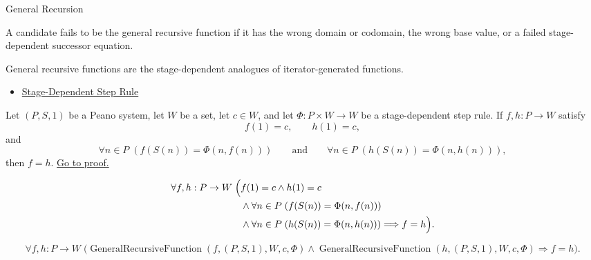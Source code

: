 \begin{topicbox}{General Recursion}
\begin{remark*}
A candidate fails to be the general recursive function if it has the wrong
domain or codomain, the wrong base value, or a failed stage-dependent
successor equation.
\end{remark*}

\begin{remark*}[Interpretation]
General recursive functions are the stage-dependent analogues of
iterator-generated functions.
\end{remark*}

\begin{remark*}[Dependencies]
\begin{itemize}
  \item \hyperref[def:stage-dependent-step-rule]{Stage-Dependent Step Rule}
\end{itemize}
\end{remark*}

\begin{tcolorbox}[colback=lembox, colframe=lemborder, arc=2pt,
  left=6pt, right=6pt, top=4pt, bottom=4pt,
  title={\small\textbf{Lemma (Uniqueness of General Recursive Functions)}},
  fonttitle=\small\bfseries]
\begin{lemma}
\label{lem:uniqueness-of-general-recursive-functions}
Let $(P,S,1)$ be a Peano system, let $W$ be a set, let $c\in W$, and let
$\Phi:P\times W\to W$ be a stage-dependent step rule. If $f,h:P\to W$ satisfy
\[
f(1)=c,\qquad h(1)=c,
\]
and
\[
\forall n\in P\;(f(S(n))=\Phi(n,f(n)))
\qquad\text{and}\qquad
\forall n\in P\;(h(S(n))=\Phi(n,h(n))),
\]
then $f=h$.
\hyperref[prf:uniqueness-of-general-recursive-functions]{Go to proof.}
\end{lemma}
\end{tcolorbox}

\begin{remark*}
\[
\begin{aligned}
\forall f,h:P\to W\;\Bigl(&
f(1)=c\land h(1)=c\\
&\land \forall n\in P\;(f(S(n))=\Phi(n,f(n)))\\
&\land \forall n\in P\;(h(S(n))=\Phi(n,h(n)))
\Longrightarrow f=h\Bigr).
\end{aligned}
\]
\end{remark*}

\begin{remark*}
\[
\forall f,h:P\to W\;
\bigl(\operatorname{GeneralRecursiveFunction}(f,(P,S,1),W,c,\Phi)
\land \operatorname{GeneralRecursiveFunction}(h,(P,S,1),W,c,\Phi)
\Longrightarrow f=h\bigr).
\]
\end{remark*}


\end{topicbox}
